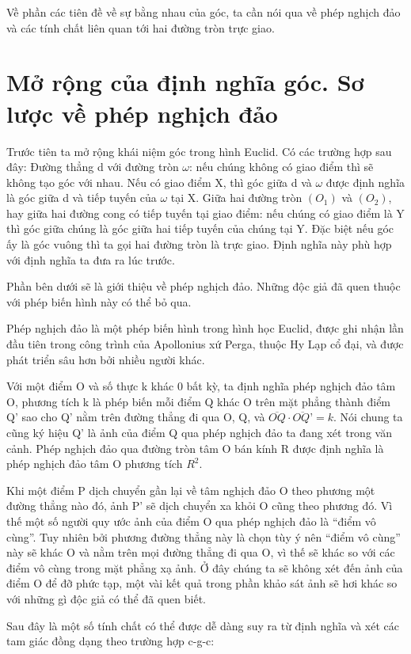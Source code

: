 Về phần các tiên đề về sự bằng nhau của góc, ta cần nói qua về phép nghịch đảo và các tính chất liên quan tới hai đường tròn trực giao.

\section{Mở rộng của định nghĩa góc. Sơ lược về phép nghịch đảo}
Trước tiên ta mở rộng khái niệm góc trong hình Euclid. Có các trường hợp sau đây:
Đường thẳng d với đường tròn $\omega$: nếu chúng không có giao điểm thì sẽ không tạo góc với nhau. Nếu có giao điểm X, thì góc giữa d và $\omega$ được định nghĩa là góc giữa d và tiếp tuyến của $\omega$ tại X.
Giữa hai đường tròn $(O_1)$ và $(O_2)$, hay giữa hai đường cong có tiếp tuyến tại giao điểm: nếu chúng có giao điểm là Y thì góc giữa chúng là góc giữa hai tiếp tuyến của chúng tại Y. Đặc biệt nếu góc ấy là góc vuông thì ta gọi hai đường tròn là trực giao. Định nghĩa này phù hợp với định nghĩa ta đưa ra lúc trước. 

Phần bên dưới sẽ là giới thiệu về phép nghịch đảo. Những độc giả đã quen thuộc với phép biến hình này có thể bỏ qua. 

Phép nghịch đảo là một phép biến hình trong hình học Euclid, được ghi nhận lần đầu tiên trong công trình của Apollonius xứ Perga, thuộc Hy Lạp cổ đại, và được phát triển sâu hơn bởi nhiều người khác.
 
Với một điểm O và số thực k khác 0 bất kỳ, ta định nghĩa phép nghịch đảo tâm O, phương tích k là phép biến mỗi điểm Q khác O trên mặt phẳng thành điểm Q’ sao cho Q’ nằm trên đường thẳng đi qua O, Q, và 
$ \overline{OQ}\cdot \overline{OQ’} = k$. 
Nói chung ta cũng ký hiệu Q’ là ảnh của điểm Q qua phép nghịch đảo ta đang xét trong văn cảnh.
Phép nghịch đảo qua đường tròn tâm O bán kính R được định nghĩa là phép nghịch đảo tâm O phương tích $R^2$.

Khi một điểm P dịch chuyển gần lại về tâm nghịch đảo O theo phương một đường thẳng nào đó, ảnh P’ sẽ dịch chuyển xa khỏi O cũng theo phương đó. Vì thế một số người quy ước ảnh của điểm O qua phép nghịch đảo là ``điểm vô cùng”. Tuy nhiên bởi phương đường thẳng này là chọn tùy ý nên ``điểm vô cùng” này sẽ khác O và nằm trên mọi đường thẳng đi qua O, vì thế sẽ khác so với các điểm vô cùng trong mặt phẳng xạ ảnh. Ở đây chúng ta sẽ không xét đến ảnh của điểm O để đỡ phức tạp, một vài kết quả trong phần khảo sát ảnh sẽ hơi khác so với những gì độc giả có thể đã quen biết.
 
Sau đây là một số tính chất có thể được dễ dàng suy ra từ định nghĩa và xét các tam giác đồng dạng theo trường hợp c-g-c:

